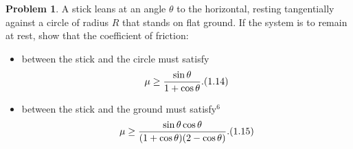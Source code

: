 \documentclass{article}
\theoremstyle{definition}
\newtheorem{problem}{Problem}
\begin{document}
\begin{problem}
    \begin{minipage}[t]{0.68\textwidth}
      \noindent
    A stick leans at an angle $\theta$ to the horizontal, resting tangentially against a circle of radius $R$ that stands on flat ground. If the system is to remain at rest, show that the coefficient of friction:
    
    \vspace{0.5em}
    \begin{itemize}
        \item[(a)] between the stick and the circle must satisfy
        \begin{equation*}
            \mu \ge \frac{\sin\theta}{1 + \cos\theta}. \hfill (1.14)
        \end{equation*}
        \item[(b)] between the stick and the ground must satisfy$^6$
        \begin{equation*}
            \mu \ge \frac{\sin\theta \cos\theta}{(1 + \cos\theta)(2 - \cos\theta)}. \hfill (1.15)
        \end{equation*}
    \end{itemize}
    \end{minipage}%
    \hfill
    \begin{minipage}[t]{0.28\textwidth}
    \vspace{0pt}
    \centering
    \vspace{0.5em}
    \end{minipage}
\end{problem}
\end{document}
